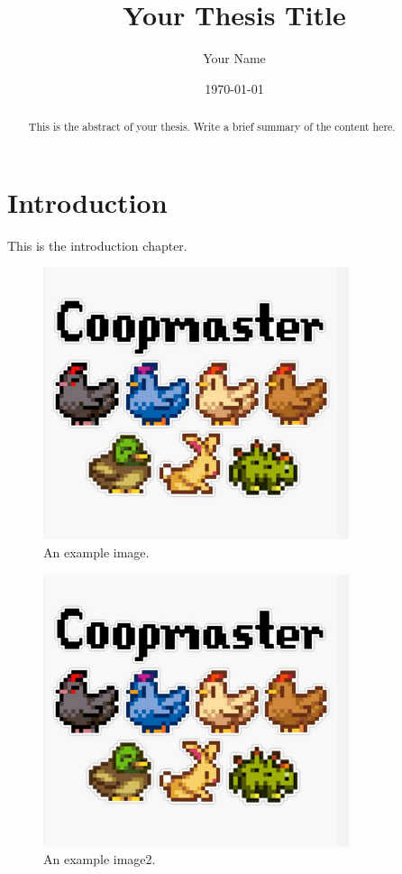 \documentclass[12pt, a4paper]{report}
\begin{document}
\title{Your Thesis Title}
\author{Your Name}
\date{\today}
\maketitle

\begin{abstract}
  This is the abstract of your thesis. Write a brief summary of the content here.
\end{abstract}

\tableofcontents

\printindex

\chapter{Introduction}
\label{chap:introduction}
This is the introduction chapter.

\begin{figure}[h!]
  \centering
  \includegraphics[width=0.8\textwidth]{./images/coopmaster}
  \caption{An example image.}
  \label{fig:example}
\end{figure}


\begin{figure}[h!]
  \centering
  \includegraphics[width=0.8\textwidth]{coopmaster}
  \caption{An example image2.}
  \label{fig:example2}
\end{figure}
\end{document}
